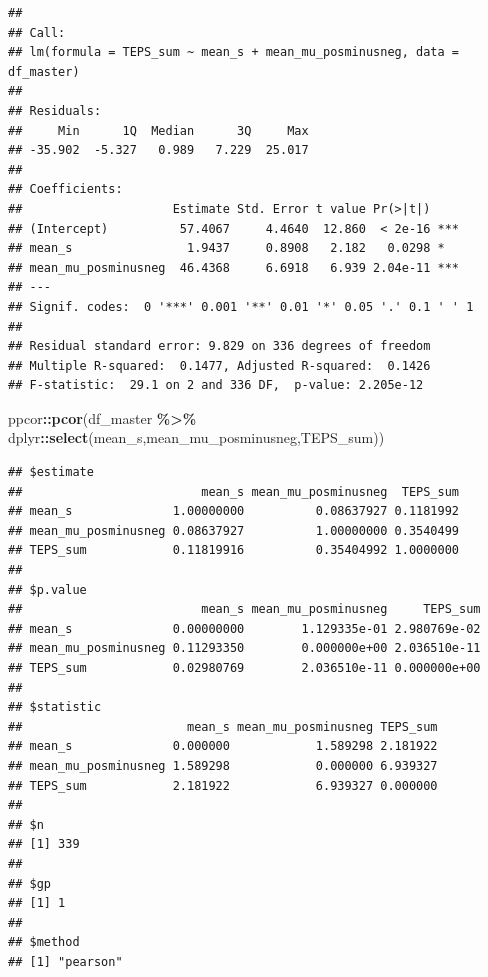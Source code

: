 \documentclass[
]{article}
\newenvironment{Shaded}{\begin{snugshade}}{\end{snugshade}}
\newcommand{\FunctionTok}[1]{\textcolor[rgb]{0.13,0.29,0.53}{\textbf{#1}}}
\newcommand{\NormalTok}[1]{#1}
\newcommand{\SpecialCharTok}[1]{\textcolor[rgb]{0.81,0.36,0.00}{\textbf{#1}}}
\begin{document}
\begin{verbatim}
## 
## Call:
## lm(formula = TEPS_sum ~ mean_s + mean_mu_posminusneg, data = df_master)
## 
## Residuals:
##     Min      1Q  Median      3Q     Max 
## -35.902  -5.327   0.989   7.229  25.017 
## 
## Coefficients:
##                     Estimate Std. Error t value Pr(>|t|)    
## (Intercept)          57.4067     4.4640  12.860  < 2e-16 ***
## mean_s                1.9437     0.8908   2.182   0.0298 *  
## mean_mu_posminusneg  46.4368     6.6918   6.939 2.04e-11 ***
## ---
## Signif. codes:  0 '***' 0.001 '**' 0.01 '*' 0.05 '.' 0.1 ' ' 1
## 
## Residual standard error: 9.829 on 336 degrees of freedom
## Multiple R-squared:  0.1477, Adjusted R-squared:  0.1426 
## F-statistic:  29.1 on 2 and 336 DF,  p-value: 2.205e-12
\end{verbatim}

\begin{Shaded}
\begin{Highlighting}[]
\NormalTok{ppcor}\SpecialCharTok{::}\FunctionTok{pcor}\NormalTok{(df\_master }\SpecialCharTok{\%\textgreater{}\%}\NormalTok{ dplyr}\SpecialCharTok{::}\FunctionTok{select}\NormalTok{(mean\_s,mean\_mu\_posminusneg,TEPS\_sum))}
\end{Highlighting}
\end{Shaded}

\begin{verbatim}
## $estimate
##                         mean_s mean_mu_posminusneg  TEPS_sum
## mean_s              1.00000000          0.08637927 0.1181992
## mean_mu_posminusneg 0.08637927          1.00000000 0.3540499
## TEPS_sum            0.11819916          0.35404992 1.0000000
## 
## $p.value
##                         mean_s mean_mu_posminusneg     TEPS_sum
## mean_s              0.00000000        1.129335e-01 2.980769e-02
## mean_mu_posminusneg 0.11293350        0.000000e+00 2.036510e-11
## TEPS_sum            0.02980769        2.036510e-11 0.000000e+00
## 
## $statistic
##                       mean_s mean_mu_posminusneg TEPS_sum
## mean_s              0.000000            1.589298 2.181922
## mean_mu_posminusneg 1.589298            0.000000 6.939327
## TEPS_sum            2.181922            6.939327 0.000000
## 
## $n
## [1] 339
## 
## $gp
## [1] 1
## 
## $method
## [1] "pearson"
\end{verbatim}
\end{document}
